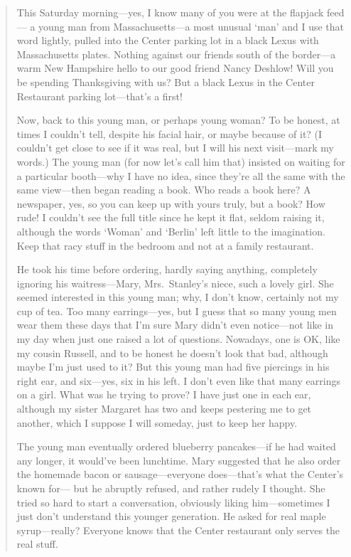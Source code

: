 \begin{quote}
This Saturday morning---yes, I know many of you were at the flapjack
feed--- a young man from Massachusetts---a most unusual `man' and I use
that word lightly, pulled into the Center parking lot in a black Lexus
with Massachusetts plates. Nothing against our friends south of the
border---a warm New Hampshire hello to our good friend Nancy Deshlow!
Will you be spending Thanksgiving with us? But a black Lexus in the
Center Restaurant parking lot---that's a first!

Now, back to this young man, or perhaps young woman? To be honest, at
times I couldn't tell, despite his facial hair, or maybe because of it?
(I couldn't get close to see if it was real, but I will his next
visit---mark my words.) The young man (for now let's call him that)
insisted on waiting for a particular booth---why I have no idea, since
they're all the same with the same view---then began reading a book. Who
reads a book here? A newspaper, yes, so you can keep up with yours
truly, but a book? How rude! I couldn't see the full title since he kept
it flat, seldom raising it, although the words `Woman' and `Berlin' left
little to the imagination. Keep that racy stuff in the bedroom and not
at a family restaurant.

He took his time before ordering, hardly saying anything, completely
ignoring his waitress---Mary, Mrs.~Stanley's niece, such a lovely girl.
She seemed interested in this young man; why, I don't know, certainly
not my cup of tea. Too many earrings---yes, but I guess that so many
young men wear them these days that I'm sure Mary didn't even
notice---not like in my day when just one raised a lot of questions.
Nowadays, one is OK, like my cousin Russell, and to be honest he doesn't
look that bad, although maybe I'm just used to it? But this young man
had five piercings in his right ear, and six---yes, six in his left. I
don't even like that many earrings on a girl. What was he trying to
prove? I have just one in each ear, although my sister Margaret has two
and keeps pestering me to get another, which I suppose I will someday,
just to keep her happy.

The young man eventually ordered blueberry pancakes---if he had waited
any longer, it would've been lunchtime. Mary suggested that he also
order the homemade bacon or sausage---everyone does---that's what the
Center's known for--- but he abruptly refused, and rather rudely I
thought. She tried so hard to start a conversation, obviously liking
him---sometimes I just don't understand this younger generation. He
asked for real maple syrup---really? Everyone knows that the Center
restaurant only serves the real stuff.


\end{quote}
